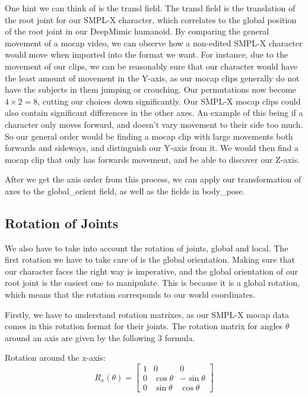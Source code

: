 \documentclass{l4proj}
\begin{document}
One hint we can think of is the transl field. The transl field is the translation of the root joint for our SMPL-X character, which correlates to the global position of the root joint in our DeepMimic humanoid. By comparing the general movement of a mocap video, we can observe how a non-edited SMPL-X character would move when imported into the format we want. For instance, due to the movement of our clips, we can be reasonably sure that our character would have the least amount of movement in the Y-axis, as our mocap clips generally do not have the subjects in them jumping or crouching. Our permutations now become $4 \times 2 = 8$, cutting our choices down significantly. Our SMPL-X mocap clips could also contain significant differences in the other axes. An example of this being if a character only moves forward, and doesn't vary movement to their side too much. So our general order would be finding a mocap clip with large movements both forwards and sideways, and distinguish our Y-axis from it. We would then find a mocap clip that only has forwards movement, and be able to discover our Z-axis.

After we get the axis order from this process, we can apply our transformation of axes to the global\_orient field, as well as the fields in body\_pose.

\subsection{Rotation of Joints}
We also have to take into account the rotation of joints, global and local. The first rotation we have to take care of is the global orientation. Making sure that our character faces the right way is imperative, and the global orientation of our root joint is the easiest one to manipulate. This is because it is a global rotation, which means that the rotation corresponds to our world coordinates.

Firstly, we have to understand rotation matrixes, as our SMPL-X mocap data comes in this rotation format for their joints. The rotation matrix for angles $\theta$ around an axis are given by the following 3 formula.

Rotation around the x-axis:
\begin{equation}
  R_x(\theta) = \begin{bmatrix}
    1 & 0 & 0\\
    0 & \cos\theta & -\sin\theta\\
    0 & \sin\theta & \cos\theta
  \end{bmatrix}
\end{equation}
\end{document}

